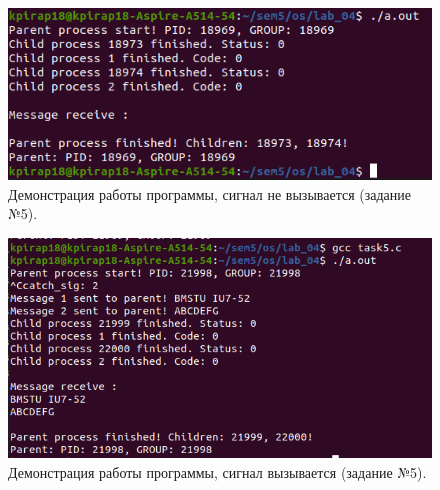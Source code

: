 \documentclass[12pt]{report}
\begin{document}
\begin{figure}[H]

	\centering

	\includegraphics[width=\linewidth]{img/p5.png}
	\caption{Демонстрация работы программы, сигнал не вызывается (задание №5).}

	\label{fig:p5}

\end{figure}


\begin{figure}[H]
	
	\centering
	
	\includegraphics[width=\linewidth]{img/p5_2.png}
	\caption{Демонстрация работы программы, сигнал вызывается (задание №5).}
	
	\label{fig:p5_2}
	
\end{figure}


\end{document}
